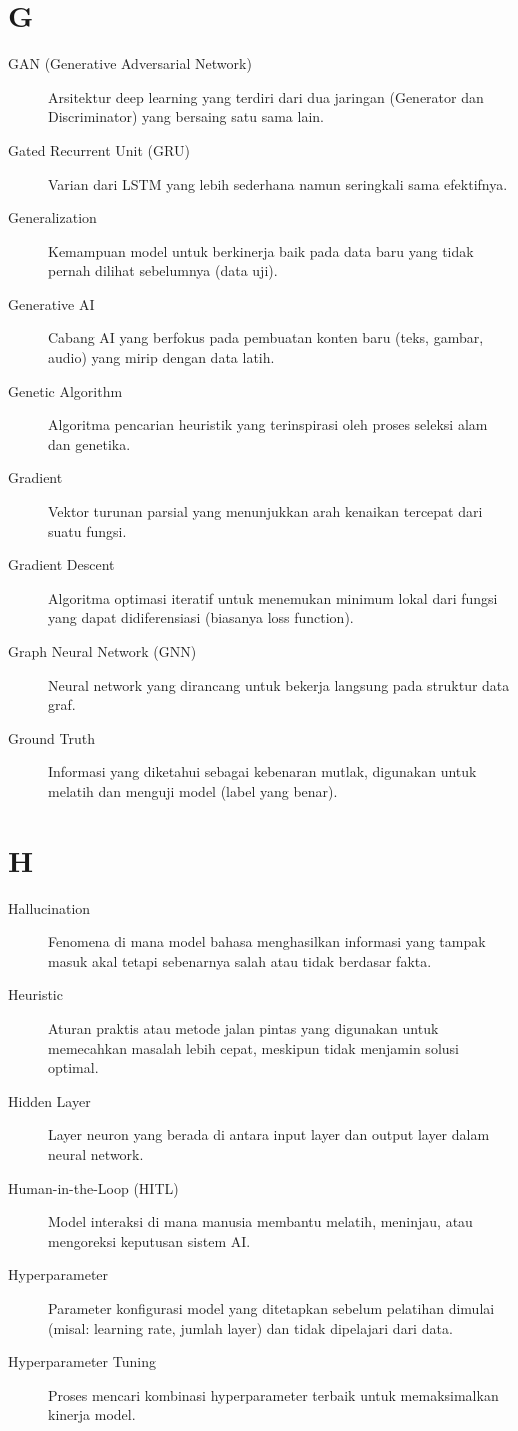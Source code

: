 \section*{G}
\begin{description}
    \item[GAN (Generative Adversarial Network)] Arsitektur deep learning yang terdiri dari dua jaringan (Generator dan Discriminator) yang bersaing satu sama lain.
    \item[Gated Recurrent Unit (GRU)] Varian dari LSTM yang lebih sederhana namun seringkali sama efektifnya.
    \item[Generalization] Kemampuan model untuk berkinerja baik pada data baru yang tidak pernah dilihat sebelumnya (data uji).
    \item[Generative AI] Cabang AI yang berfokus pada pembuatan konten baru (teks, gambar, audio) yang mirip dengan data latih.
    \item[Genetic Algorithm] Algoritma pencarian heuristik yang terinspirasi oleh proses seleksi alam dan genetika.
    \item[Gradient] Vektor turunan parsial yang menunjukkan arah kenaikan tercepat dari suatu fungsi.
    \item[Gradient Descent] Algoritma optimasi iteratif untuk menemukan minimum lokal dari fungsi yang dapat didiferensiasi (biasanya loss function).
    \item[Graph Neural Network (GNN)] Neural network yang dirancang untuk bekerja langsung pada struktur data graf.
    \item[Ground Truth] Informasi yang diketahui sebagai kebenaran mutlak, digunakan untuk melatih dan menguji model (label yang benar).
\end{description}

\section*{H}
\begin{description}
    \item[Hallucination] Fenomena di mana model bahasa menghasilkan informasi yang tampak masuk akal tetapi sebenarnya salah atau tidak berdasar fakta.
    \item[Heuristic] Aturan praktis atau metode jalan pintas yang digunakan untuk memecahkan masalah lebih cepat, meskipun tidak menjamin solusi optimal.
    \item[Hidden Layer] Layer neuron yang berada di antara input layer dan output layer dalam neural network.
    \item[Human-in-the-Loop (HITL)] Model interaksi di mana manusia membantu melatih, meninjau, atau mengoreksi keputusan sistem AI.
    \item[Hyperparameter] Parameter konfigurasi model yang ditetapkan sebelum pelatihan dimulai (misal: learning rate, jumlah layer) dan tidak dipelajari dari data.
    \item[Hyperparameter Tuning] Proses mencari kombinasi hyperparameter terbaik untuk memaksimalkan kinerja model.
\end{description}

